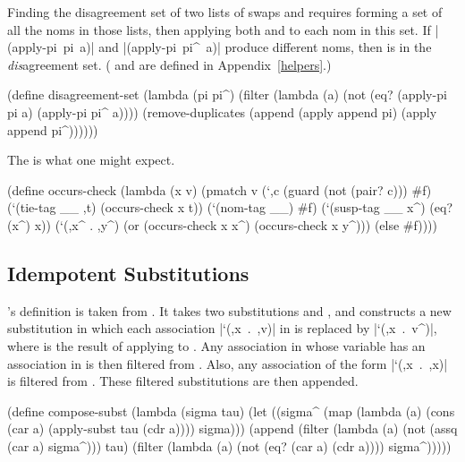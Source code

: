 Finding the disagreement set of two lists of swaps
 and  requires
forming a set of all the noms in those lists, then applying both 
and  to each nom  in this set.
If \mbox{\scheme|(apply-pi pi a)|} and \mbox{\scheme|(apply-pi pi^ a)|}
produce different noms, then  is in the \emph{dis}agreement set.
( and  are defined 
in Appendix~\ref{helpers}.)

\schemedisplayspace
\begin{schemedisplay}
(define disagreement-set
  (lambda (pi pi^)
    (filter
      (lambda (a) (not (eq? (apply-pi pi a) (apply-pi pi^ a))))
      (remove-duplicates
        (append (apply append pi) (apply append pi^))))))
\end{schemedisplay}

The  is what one might expect.

\schemedisplayspace
\begin{schemedisplay}
(define occurs-check
  (lambda (x v)
    (pmatch v
      (`,c (guard (not (pair? c))) #f)
      (`(tie-tag __ ,t) (occurs-check x t))      
      (`(nom-tag __) #f)
      (`(susp-tag __ x^) (eq? (x^) x))
      (`(,x^ . ,y^) (or (occurs-check x x^) (occurs-check x y^)))
      (else #f))))
\end{schemedisplay}

\subsection{Idempotent Substitutions}\label{applysubst}

's definition is taken from \citet{lloyd:lp}.  It
takes two substitutions  and , and constructs a new
substitution  in which each association \mbox{\scheme|`(,x . ,v)|}
in  is replaced by \mbox{\scheme|`(,x . v^)|}, where  is the result
of applying  to .
Any association in  whose
variable has an association in  is then filtered from .
Also, any association of the form \mbox{\scheme|`(,x . ,x)|} is filtered from .
These filtered substitutions are then appended.

\schemedisplayspace
\begin{schemedisplay}
(define compose-subst
  (lambda (sigma tau)
    (let ((sigma^ (map
                    (lambda (a) (cons (car a) (apply-subst tau (cdr a))))
                    sigma)))
      (append
        (filter (lambda (a) (not (assq (car a) sigma^))) tau)
        (filter (lambda (a) (not (eq? (car a) (cdr a)))) sigma^)))))
\end{schemedisplay}

